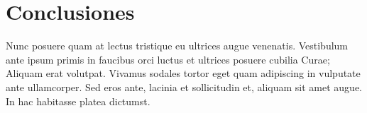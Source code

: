 \section{Conclusiones}

Nunc posuere quam at lectus tristique eu ultrices augue venenatis. Vestibulum ante ipsum primis in faucibus orci luctus et ultrices posuere cubilia Curae; Aliquam erat volutpat. Vivamus sodales tortor eget quam adipiscing in vulputate ante ullamcorper. Sed eros ante, lacinia et sollicitudin et, aliquam sit amet augue. In hac habitasse platea dictumst.
